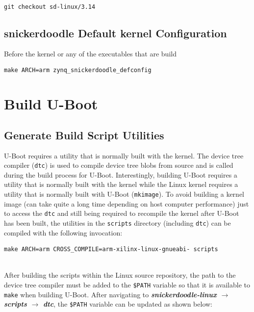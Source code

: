 \begin{lstlisting}[style=text]
git checkout sd-linux/3.14
\end{lstlisting}


\subsection{snickerdoodle Default kernel Configuration}

Before the kernel or any of the executables that are build 

\begin{lstlisting}
make ARCH=arm zynq_snickerdoodle_defconfig
\end{lstlisting}



\section{Build U-Boot}

\subsection{Generate Build Script Utilities}
U-Boot requires a utility that is normally built with the kernel. The device tree compiler (\texttt{dtc}) is used to compile device tree blobs from source and is called during the build process for U-Boot. Interestingly, building U-Boot requires a utility that is normally built with the kernel while the Linux kernel requires a utility that is normally built with U-Boot (\texttt{mkimage}). To avoid building a kernel image (can take quite a long time depending on host computer performance) just to access the \texttt{dtc} and still being required to recompile the kernel after U-Boot has been built, the utilities in the \texttt{scripts} directory (including \texttt{dtc}) can be compiled with the following invocation: \\

\begin{lstlisting}[style=text]
make ARCH=arm CROSS_COMPILE=arm-xilinx-linux-gnueabi- scripts
\end{lstlisting}

~\\
\noindent
After building the scripts within the Linux source repository, the path to the device tree compiler must be added to the \texttt{\$PATH} variable so that it is available to \texttt{make} when building U-Boot. After navigating to \textit{\bfseries snickerdoodle-linux $\rightarrow$ scripts $\rightarrow$ dtc}, the \texttt{\$PATH} variable can be updated as shown below: \\

